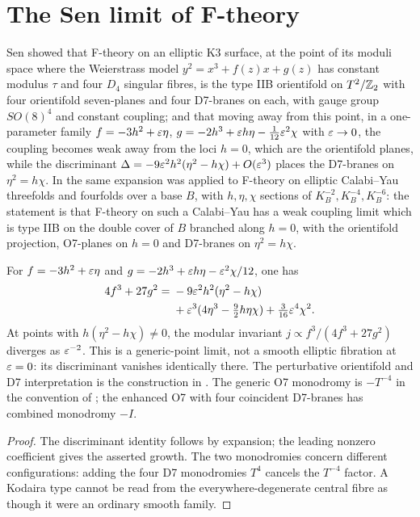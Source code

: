 \section{The Sen limit of F-theory}\label{sec:senlimit}

Sen \cite{Sen96ftheory} showed that F-theory on an elliptic K3 surface, at the point of its moduli space where the Weierstrass model $y^2 = x^3 + f(z)x + g(z)$ has constant modulus $\tau$ and four $D_4$ singular fibres, is the type IIB orientifold on $T^2/\mathbb{Z}_2$ with four orientifold seven-planes and four D7-branes on each, with gauge group $SO(8)^4$ and constant coupling; and that moving away from this point, in a one-parameter family $f = -3h^2 + \varepsilon\eta$, $g = -2h^3 + \varepsilon h\eta - \tfrac{1}{12}\varepsilon^2\chi$ with $\varepsilon\to0$, the coupling becomes weak away from the loci $h=0$, which are the orientifold planes, while the discriminant $\Delta = -9\varepsilon^2 h^2(\eta^2 - h\chi) + O(\varepsilon^3)$ places the D7-branes on $\eta^2 = h\chi$. In \cite{Sen97orientifold} the same expansion was applied to F-theory on elliptic Calabi--Yau threefolds and fourfolds over a base $B$, with $h,\eta,\chi$ sections of $K_B^{-2}, K_B^{-4}, K_B^{-6}$: the statement is that F-theory on such a Calabi--Yau has a weak coupling limit which is type IIB on the double cover of $B$ branched along $h=0$, with the orientifold projection, O7-planes on $h=0$ and D7-branes on $\eta^2=h\chi$.

\begin{theorem}\label{thm:senlimitk3}
For $f=-3h^2+\varepsilon\eta$ and $g=-2h^3+\varepsilon h\eta-\varepsilon^2\chi/12$, one has
\begin{align}
4f^3+27g^2={}&-9\varepsilon^2h^2(\eta^2-h\chi)\nonumber\\
&+\varepsilon^3(4\eta^3-\tfrac92h\eta\chi)+\tfrac3{16}\varepsilon^4\chi^2.
\end{align}
At points with $h(\eta^2-h\chi)\ne0$, the modular invariant $j\propto f^3/(4f^3+27g^2)$ diverges as $\varepsilon^{-2}$. This is a generic-point limit, not a smooth elliptic fibration at $\varepsilon=0$: its discriminant vanishes identically there. The perturbative orientifold and D7 interpretation is the construction in \cite{Sen96ftheory,Sen97orientifold}. The generic O7 monodromy is $-T^{-4}$ in the convention of \cite{Sen97orientifold}; the enhanced O7 with four coincident D7-branes has combined monodromy $-I$.
\end{theorem}
\begin{proof}
The discriminant identity follows by expansion; the leading nonzero coefficient gives the asserted growth. The two monodromies concern different configurations: adding the four D7 monodromies $T^4$ cancels the $T^{-4}$ factor. A Kodaira type cannot be read from the everywhere-degenerate central fibre as though it were an ordinary smooth family.
\end{proof}

